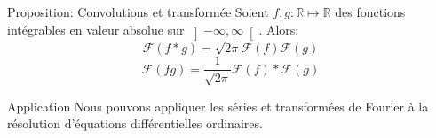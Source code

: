 \documentclass[a4paper]{article}
\begin{document}
\begin{parag}{Proposition: Convolutions et transformée}
    Soient $f, g: \mathbb{R} \mapsto \mathbb{R}$ des fonctions intégrables en valeur absolue sur $\left]-\infty, \infty\right[ $. Alors:
    \[\mathcal{F}\left(f * g\right) = \sqrt{2\pi} \mathcal{F}\left(f\right) \mathcal{F}\left(g\right)\]
    \[\mathcal{F}\left(fg\right) = \frac{1}{\sqrt{2\pi}} \mathcal{F}\left(f\right) * \mathcal{F}\left(g\right)\]
\end{parag}

\begin{parag}{Application}
    Nous pouvons appliquer les séries et transformées de Fourier à la résolution d'équations différentielles ordinaires.
\end{parag}
\end{document}
